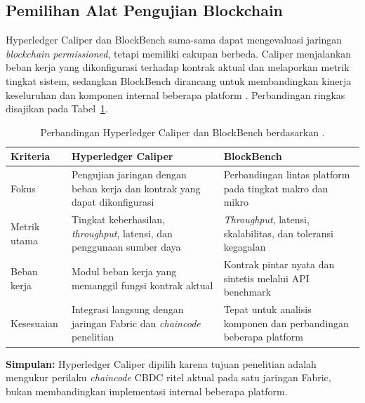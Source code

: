 \subsection{Pemilihan Alat Pengujian Blockchain}
Hyperledger Caliper dan BlockBench sama-sama dapat mengevaluasi jaringan
\textit{blockchain permissioned}, tetapi memiliki cakupan berbeda. Caliper
menjalankan beban kerja yang dikonfigurasi terhadap kontrak aktual dan
melaporkan metrik tingkat sistem, sedangkan BlockBench dirancang untuk
membandingkan kinerja keseluruhan dan komponen internal beberapa platform
\cite{hlf_caliper,dinh2017blockbench}. Perbandingan ringkas disajikan pada
Tabel~\ref{tab:caliper-blockbench}.

\begin{table}[H]
    \caption[Perbandingan Hyperledger Caliper dan BlockBench.]{Perbandingan Hyperledger Caliper dan BlockBench berdasarkan \cite{hlf_caliper,dinh2017blockbench}.}
    \label{tab:caliper-blockbench}
    \centering
    \small
    \begin{tabular}{@{}p{2.7cm}p{4.7cm}p{4.7cm}@{}}
        \toprule
        \textbf{Kriteria} & \textbf{Hyperledger Caliper} & \textbf{BlockBench} \\
        \midrule
        Fokus & Pengujian jaringan dengan beban kerja dan kontrak yang dapat dikonfigurasi & Perbandingan lintas platform pada tingkat makro dan mikro \\
        Metrik utama & Tingkat keberhasilan, \textit{throughput}, latensi, dan penggunaan sumber daya & \textit{Throughput}, latensi, skalabilitas, dan toleransi kegagalan \\
        Beban kerja & Modul beban kerja yang memanggil fungsi kontrak aktual & Kontrak pintar nyata dan sintetis melalui API benchmark \\
        Kesesuaian & Integrasi langsung dengan jaringan Fabric dan \textit{chaincode} penelitian & Tepat untuk analisis komponen dan perbandingan beberapa platform \\
        \bottomrule
    \end{tabular}
\end{table}

\noindent\textbf{Simpulan:} Hyperledger Caliper dipilih karena tujuan penelitian
adalah mengukur perilaku \textit{chaincode} CBDC ritel aktual pada satu jaringan
Fabric, bukan membandingkan implementasi internal beberapa platform.
